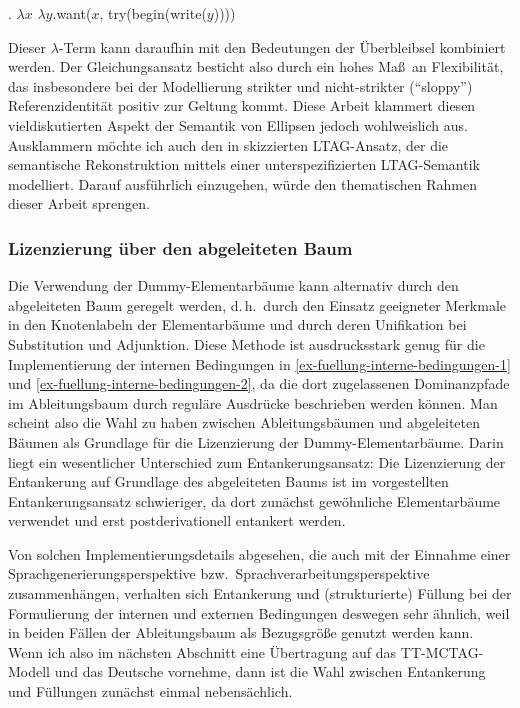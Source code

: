 \ex. \label{ex-fuellung-4}$\lambda x$ $\lambda y$.{\sc want($x$, try(begin(write($y$))))}   

Dieser $\lambda$-Term kann daraufhin mit den Bedeutungen der Überbleibsel kombiniert werden. Der Gleichungsansatz besticht also durch ein hohes Ma\ss\ an Flexibilität, das insbesondere bei der Modellierung strikter und nicht-strikter ("`sloppy"') Referenzidentität positiv zur Geltung kommt. Diese Arbeit klammert diesen vieldiskutierten Aspekt der Semantik von Ellipsen jedoch wohlweislich aus. Ausklammern möchte ich auch den in \cite{Babko-Malaya:06} skizzierten LTAG-Ansatz, der die semantische Rekonstruktion mittels einer unterspezifizierten LTAG-Semantik modelliert. Darauf ausführlich einzugehen, würde den thematischen Rahmen dieser Arbeit sprengen.


\subsubsection*{Lizenzierung über den abgeleiteten Baum}

Die Verwendung der Dummy-Elementarbäume kann alternativ durch den abgeleiteten Baum geregelt werden, d.\,h.\ durch den Einsatz geeigneter Merkmale in den Knotenlabeln der Elementarbäume und durch deren Unifikation bei Substitution und Adjunktion. Diese Methode ist ausdrucksstark genug für die Implementierung der internen Bedingungen in \ref{ex-fuellung-interne-bedingungen-1} und \ref{ex-fuellung-interne-bedingungen-2}, da die dort zugelassenen Dominanzpfade im Ableitungsbaum durch reguläre Ausdrücke beschrieben werden können. 
Man scheint also die Wahl zu haben zwischen Ableitungsbäumen und abgeleiteten Bäumen als Grundlage für die Lizenzierung der Dummy-Elementarbäume. Darin liegt ein wesentlicher Unterschied zum Entankerungsansatz: Die Lizenzierung der Entankerung auf Grundlage des abgeleiteten Baums ist im vorgestellten Entankerungsansatz schwieriger, da dort zunächst gewöhnliche Elementarbäume verwendet und erst postderivationell entankert werden.

Von solchen Implementierungsdetails abgesehen, die auch mit der Einnahme einer Sprachgenerierungsperspektive bzw.\ Sprachverarbeitungsperspektive zusammenhängen, verhalten sich Entankerung und (strukturierte) Füllung bei der Formulierung der internen und externen Bedingungen deswegen sehr ähnlich, weil in beiden Fällen der Ableitungsbaum als Bezugsgrö\ss e genutzt werden kann. Wenn ich also im nächsten Abschnitt eine Übertragung auf das TT-MCTAG-Modell und das Deutsche vornehme, dann ist die Wahl zwischen Entankerung und Füllungen zunächst einmal nebensächlich.     



